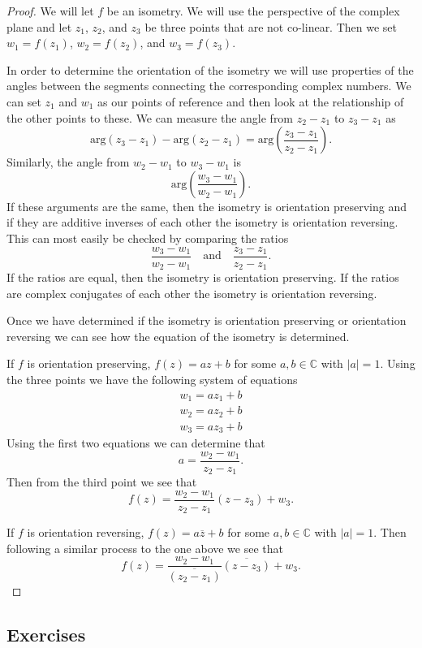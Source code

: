 \documentclass[
]{book}
\theoremstyle{definition}
\theoremstyle{definition}
\theoremstyle{definition}
\theoremstyle{definition}
\theoremstyle{remark}
\begin{document}
\begin{proof}

We will let \(f\) be an isometry. We will use the perspective of the complex plane and let \(z_1\), \(z_2\), and \(z_3\) be three points that are not co-linear. Then we set \(w_1=f(z_1)\), \(w_2=f(z_2)\), and \(w_3=f(z_3)\).

In order to determine the orientation of the isometry we will use properties of the angles between the segments connecting the corresponding complex numbers. We can set \(z_1\) and \(w_1\) as our points of reference and then look at the relationship of the other points to these. We can measure the angle from \(z_2-z_1\) to \(z_3-z_1\) as
\[\mbox{arg}(z_3-z_1)-\mbox{arg}(z_2-z_1) = \mbox{arg}\left(\frac{z_3-z_1}{z_2-z_1}\right).\]
Similarly, the angle from \(w_2-w_1\) to \(w_3-w_1\) is
\[\mbox{arg} \left( \frac{w_3-w_1}{w_2-w_1}\right).\] If these arguments are the same, then the isometry is orientation preserving and if they are additive inverses of each other the isometry is orientation reversing. This can most easily be checked by comparing the ratios
\[\frac{w_3-w_1}{w_2-w_1} \quad \mbox{and} \quad \frac{z_3-z_1}{z_2-z_1}.\] If the ratios are equal, then the isometry is orientation preserving. If the ratios are complex conjugates of each other the isometry is orientation reversing.

Once we have determined if the isometry is orientation preserving or orientation reversing we can see how the equation of the isometry is determined.

If \(f\) is orientation preserving, \(f(z)=az+b\) for some \(a,b\in \mathbb{C}\) with \(|a|=1\). Using the three points we have the following system of equations
\[\begin{matrix} w_1=a z_1 + b \\
w_2=a z_2+b \\
w_3=a z_3+b 
\end{matrix}\]
Using the first two equations we can determine that
\[a=\frac{w_2-w_1}{z_2-z_1}.\]
Then from the third point we see that \[f(z) = \frac{w_2-w_1}{z_2-z_1} (z-z_3) + w_3.\]

If \(f\) is orientation reversing, \(f(z)=a\overline{z}+b\) for some \(a,b\in \mathbb{C}\) with \(|a|=1\). Then following a similar process to the one above we see that
\[f(z)= \frac{w_2-w_1}{\overline{(z_2-z_1)}} \overline{(z-z_3)} + w_3.\]

\end{proof}

\hypertarget{exercises-56}{%
\subsection{Exercises}\label{exercises-56}}
\end{document}
